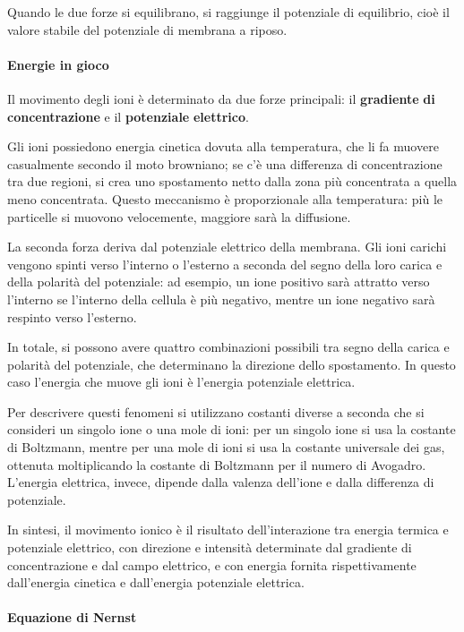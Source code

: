 \documentclass[12pt,a4paper]{book}
\begin{document}
Quando le due forze si equilibrano, si raggiunge il potenziale di equilibrio, cioè il valore stabile del potenziale di membrana a riposo.


\paragraph{Energie in gioco}

Il movimento degli ioni è determinato da due forze principali: il \textbf{gradiente}\textbf{ }\textbf{di}\textbf{ }\textbf{concentrazione}\textbf{ }e il \textbf{potenziale}\textbf{ }\textbf{elettrico}.

Gli ioni possiedono energia cinetica dovuta alla temperatura, che li fa muovere casualmente secondo il moto browniano; se c'è una differenza di concentrazione tra due regioni, si crea uno spostamento netto dalla zona più concentrata a quella meno concentrata. Questo meccanismo è proporzionale alla temperatura: più le particelle si muovono velocemente, maggiore sarà la diffusione.

La seconda forza deriva dal potenziale elettrico della membrana. Gli ioni carichi vengono spinti verso l'interno o l'esterno a seconda del segno della loro carica e della polarità del potenziale: ad esempio, un ione positivo sarà attratto verso l'interno se l'interno della cellula è più negativo, mentre un ione negativo sarà respinto verso l'esterno.

In totale, si possono avere quattro combinazioni possibili tra segno della carica e polarità del potenziale, che determinano la direzione dello spostamento. In questo caso l'energia che muove gli ioni è l'energia potenziale elettrica.

Per descrivere questi fenomeni si utilizzano costanti diverse a seconda che si consideri un singolo ione o una mole di ioni: per un singolo ione si usa la costante di Boltzmann, mentre per una mole di ioni si usa la costante universale dei gas, ottenuta moltiplicando la costante di Boltzmann per il numero di Avogadro. L'energia elettrica, invece, dipende dalla valenza dell'ione e dalla differenza di potenziale.

In sintesi, il movimento ionico è il risultato dell'interazione tra energia termica e potenziale elettrico, con direzione e intensità determinate dal gradiente di concentrazione e dal campo elettrico, e con energia fornita rispettivamente dall'energia cinetica e dall'energia potenziale elettrica.


\paragraph{Equazione di Nernst}
\end{document}
